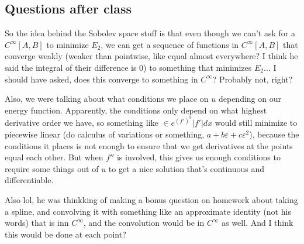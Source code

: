 \documentclass{article}
\theoremstyle{plain}
\theoremstyle{remark}
\newcommand{\ep}{{\varepsilon}}
\begin{document}
\subsection{Questions after class}
So the idea behind the Sobolev space stuff is that
even though we can't ask for a $C^\infty[A,B]$ to minimize $E_2$,
we can get a sequence of functions in $C^\infty[A,B]$ that converge
weakly (weaker than pointwise, like equal almost everywhere?
I think he said the integral of their difference is $0$)
to something that minimizes $E_2$...
I should have asked, does this converge to something in $C^\infty$?
Probably not, right?

Also, we were talking about what conditions we place on $u$ depending on our energy function.
Apparently, the conditions only depend on what highest derivative order we have,
so something like $\in e^{(f')^9}|f'|dx$ would still minimize to piecewise linear
(do calculus of variations or something, $a + b \ep + c \ep^2$),
because the conditions it places is not enough to ensure
that we get derivatives at the points equal each other.
But when $f''$ is involved, this gives us enough conditions
to require some things out of $u$ to get a nice solution that's continuous and differentiable.

Also lol, he was thinkking of making a bonus question on homework
about taking a spline, and convolving it with something like
an approximate identity (not his words) that is inn $C^ \infty$,
and the convolution would be in $C^\infty$ as well.
And I think this would be done at each point?
\end{document}

